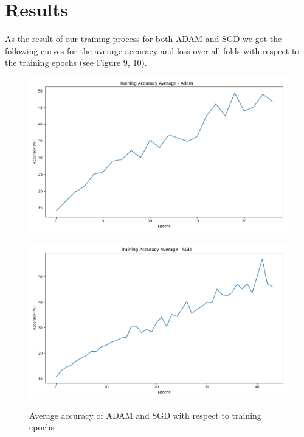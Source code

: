 \documentclass{tubaf-article}
\begin{document}
	\section{Results}
	\label{results}
	As the result of our training process for both ADAM and SGD we got the following curves for the average accuracy and loss over all folds with respect to the training epochs (see Figure 9, 10).
	\begin{figure}[h!]
		\centering
		\begin{minipage}{0.45\textwidth}
			\centering
			\includegraphics[width=\linewidth]{training_accuracy_Adam_avg.png}
			\label{fig:bild1}
		\end{minipage} \hfill
		\begin{minipage}{0.45\textwidth}
			\centering
			\includegraphics[width=\linewidth]{training_accuracy_sgd_avg.png}
			\label{fig:bild2}
		\end{minipage}
		\caption{Average accuracy of ADAM and SGD with respect to training epochs}
		\label{fig:zwei_bilder}
	\end{figure}
\end{document}
